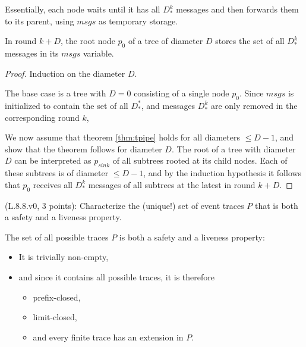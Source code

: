 Essentially, each node waits until it has all $D_*^k$ messages and
then forwards them to its parent, using $msgs$ as temporary storage.

\begin{lemma} \label{lem:tpipe}
In round $k + D$, the root node $p_0$ of a tree of diameter $D$
stores the set of all $D_*^k$ messages in its $msgs$ variable.
\end{lemma}

\begin{proof}
Induction on the diameter $D$.

The base case is a tree with $D = 0$ consisting of a single node $p_0$. Since $msgs$
is initialized to contain the set of all $D_*^*$, and messages $D_*^k$ are only removed in the
corresponding round $k$,

We now assume that theorem \ref{thm:tpipe} holds for all diameters $\leq D - 1$,
and show that the theorem follows for diameter $D$. The root of a tree with diameter $D$
can be interpreted as $p_{sink}$ of all subtrees rooted at its child nodes. Each of these subtrees
is of diameter $\leq D - 1$, and by the induction hypothesis it follows that $p_0$
receives all $D_*^k$ messages of all subtrees at the latest in round $k + D$.
\end{proof}



\begin{Exc}{(L.8.8.v0, 3 points):}
Characterize the (unique!) set of event traces $P$ that is both
a safety and a liveness property.
\end{Exc}


The set of all possible traces $P$ is both a safety and a liveness property:

\begin{itemize}
\item It is trivially non-empty,
\item and since it contains all possible traces, it is therefore
    \begin{itemize}
    \item prefix-closed,
    \item limit-closed,
    \item and every finite trace has an extension in $P$.
    \end{itemize}
\end{itemize}

